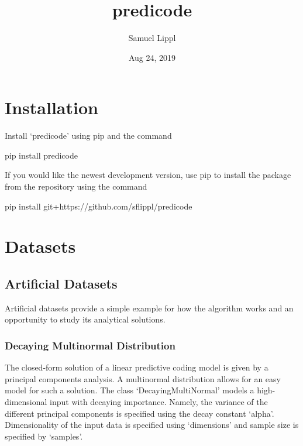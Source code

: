\documentclass[letterpaper,10pt,english]{sphinxmanual}
\title{predicode}
\date{Aug 24, 2019}
\author{Samuel Lippl}
\begin{document}
\pagestyle{empty}
\sphinxmaketitle
\pagestyle{plain}
\sphinxtableofcontents
\pagestyle{normal}
\label{\detokenize{index::doc}}



\chapter{Installation}
\label{\detokenize{usage/installation:Installation}}\label{\detokenize{usage/installation::doc}}
Install ‘predicode’ using pip and the command

\begin{sphinxVerbatim}[commandchars=\\\{\}]
pip install predicode
\end{sphinxVerbatim}

If you would like the newest development version, use pip to install the package from the  repository using the command

\begin{sphinxVerbatim}[commandchars=\\\{\}]
pip install git+https://github.com/sflippl/predicode
\end{sphinxVerbatim}


\chapter{Datasets}
\label{\detokenize{usage/datasets:Datasets}}\label{\detokenize{usage/datasets::doc}}

\section{Artificial Datasets}
\label{\detokenize{usage/datasets:Artificial-Datasets}}
Artificial datasets provide a simple example for how the algorithm works and an opportunity to study its analytical solutions.


\subsection{Decaying Multinormal Distribution}
\label{\detokenize{usage/datasets:Decaying-Multinormal-Distribution}}
The closed-form solution of a linear predictive coding model is given by a principal components analysis. A multinormal distribution allows for an easy model for such a solution. The class ‘DecayingMultiNormal’ models a high-dimensional input with decaying importance. Namely, the variance of the different principal components is specified using the decay constant ‘alpha’. Dimensionality of the input data is specified using ‘dimensions’ and sample size is specified by ‘samples’.
\end{document}
